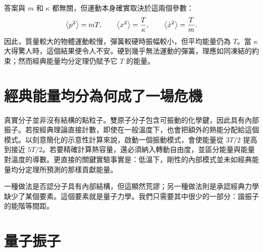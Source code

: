 答案與 \(m\) 和 \(\kappa\) 都無關，但運動本身確實取決於這兩個參數：
\begin{equation}
 \left\langle p^2\right\rangle=mT,
 \qquad
 \left\langle x^2\right\rangle=\frac{T}{\kappa},
 \qquad
 \left\langle\dot{x}^2\right\rangle=\frac{T}{m}.
 \label{eq:sm7-classical-fluctuations}
\end{equation}
因此，質量較大的物體運動較慢，彈簧較硬時振幅較小，但平均能量仍為 \(T\)。當 \(\kappa\) 大得驚人時，這個結果便令人不安。硬到幾乎無法運動的彈簧，理應如同凍結的約束；然而經典能量均分定理仍賦予它 \(T\) 的能量。

\begin{classroomqa}
\end{classroomqa}

\begin{classroomqa}
\end{classroomqa}

\section{經典能量均分為何成了一場危機}

真實分子並非沒有結構的點粒子。雙原子分子包含可振動的化學鍵，因此具有內部振子。若按經典理論直接計數，即使在一般溫度下，也會把額外的熱能分配給這個模式。以刻意簡化的示意性計算來說，啟動一個振動模式，會使能量從 \(3T/2\) 提高到接近 \(5T/2\)。若要精確計算熱容量，還必須納入轉動自由度，並區分能量與能量對溫度的導數。更直接的關鍵實驗事實是：低溫下，剛性的內部模式並未如經典能量均分定理所預測的那樣貢獻能量。

一種做法是否認分子具有內部結構，但這顯然荒謬；另一種做法則是承認經典力學缺少了某個要素。這個要素就是量子力學。我們只需要其中很少的一部分：諧振子的能階等間距。

\section{量子振子}

